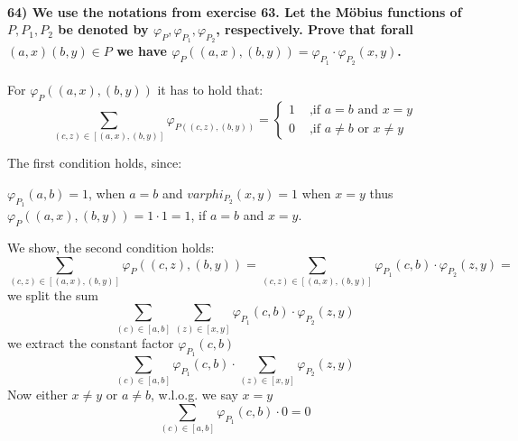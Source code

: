 \documentclass[
]{article}
\begin{document}
\hypertarget{we-use-the-notations-from-exercise-63.-let-the-muxf6bius-functions-of-pp_1p_2-be-denoted-by-varphi_p-varphi_p_1-varphi_p_2-respectively.-prove-that-forall-ax-by-in-p-we-have-varphi_paxby-varphi_p_1-cdot-varphi_p_2xy.}{%
\paragraph{\texorpdfstring{64) We use the notations from exercise 63.
Let the Möbius functions of \(P,P_1,P_2\) be denoted by
\(\varphi_P, \varphi_{P_1}, \varphi_{P_2}\), respectively. Prove that
forall \((a,x) (b,y) \in P\) we have
\(\varphi_P((a,x),(b,y)) = \varphi_{P_1} \cdot \varphi_{P_2}(x,y)\).}{64) We use the notations from exercise 63. Let the Möbius functions of P,P\_1,P\_2 be denoted by \textbackslash varphi\_P, \textbackslash varphi\_\{P\_1\}, \textbackslash varphi\_\{P\_2\}, respectively. Prove that forall (a,x) (b,y) \textbackslash in P we have \textbackslash varphi\_P((a,x),(b,y)) = \textbackslash varphi\_\{P\_1\} \textbackslash cdot \textbackslash varphi\_\{P\_2\}(x,y).}}\label{we-use-the-notations-from-exercise-63.-let-the-muxf6bius-functions-of-pp_1p_2-be-denoted-by-varphi_p-varphi_p_1-varphi_p_2-respectively.-prove-that-forall-ax-by-in-p-we-have-varphi_paxby-varphi_p_1-cdot-varphi_p_2xy.}}

For \(\varphi_P((a,x),(b,y))\) it has to hold that: \[
\sum_{(c,z) \in [(a,x),(b,y)]}
\varphi_{P((c,z),(b,y))} = \begin{cases}
1 &\text{ ,if $a=b$ and $x=y$}\\
0 &\text{ ,if $a \neq b$ or $x \neq y$}
\end{cases}
\]

The first condition holds, since:

\(\varphi_{P_1}(a,b) = 1\), when \(a=b\) and \(varphi_{P_2}(x,y) = 1\)
when \(x = y\) thus \(\varphi_P((a,x),(b,y)) = 1 \cdot 1 = 1\), if
\(a=b\) and \(x = y\).

We show, the second condition holds: \[
\sum_{(c,z) \in [(a,x),(b,y)]} \varphi_P((c,z),(b,y)) = \sum_{(c,z) \in [(a,x),(b,y)]} \varphi_{P_1}(c,b) \cdot \varphi_{P_2}(z,y) =
\] we split the sum \[
\sum_{(c) \in [a,b]} \sum_{(z) \in [x,y]} \varphi_{P_1}(c,b) \cdot \varphi_{P_2}(z,y)
\] we extract the constant factor \(\varphi_{P_1}(c,b)\) \[
\sum_{(c) \in [a,b]} \varphi_{P_1}(c,b) \cdot \sum_{(z) \in [x,y]} \varphi_{P_2}(z,y)
\] Now either \(x \neq y\) or \(a \neq b\), w.l.o.g. we say \(x = y\) \[
\sum_{(c) \in [a,b]} \varphi_{P_1}(c,b) \cdot 0 = 0
\]
\end{document}
